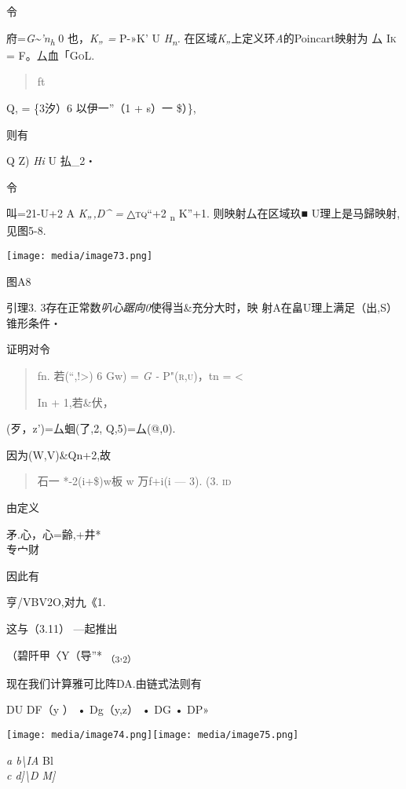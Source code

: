 \documentclass{article}
\begin{document}
令

府=\emph{G\textasciitilde{}'n\textsubscript{h}} 0 也，\emph{K„ =} P-»K'
U \emph{H\textsubscript{n}.}
在区域\emph{K„}上定义环\emph{A}的Poincart映射为 厶 \textsc{Ik} =
F。厶血\textsc{「GoL.}

\begin{quote}
ft
\end{quote}

Q, = \{3汐）6 以伊一''（1 + s）一 \$）\},

则有

Q Z) \emph{Hi} U 払\_2・

令

叫=21-U+2 A \emph{K„,D\^{} =} \textsc{△tq``+2} \textsubscript{n} K''+1.
则映射厶在区域玖■ U理上是马歸映射,见图5-8.

\texttt{[image: media/image73.png]}

图A8

引理3. 3存在正常数\emph{叭心踞向0}使得当\&充分大时，映
射A在畠U理上满足（出,S）锥形条件・

证明对令

\begin{quote}
fn. 若(``,!\textgreater{}) 6 Gw) = \emph{G -} \textsc{P"(r,u)}，tn =
\textless{}

In + 1,若\&伏，
\end{quote}

(歹，z')=厶蛔(了,2, Q,5)=厶(@,0).

因为(W,V)\&Qn+2,故

\begin{quote}
石一 *-2(i+\$)w板 w 万f+i(i --- 3). (3. \textsc{id}
\end{quote}

由定义

矛.心，心=齢,+井*\\
专宀财

因此有

亨/VBV2O,对九《1.

这与（3.11） ---起推出

（碧阡甲〈Y（导''* \textsubscript{（3},\textsubscript{2）}

现在我们计算雅可比阵DA.由链式法则有

DU DF（y ） • Dg（y,z） • DG • DP»

\texttt{[image: media/image74.png]}\texttt{[image: media/image75.png]}

\emph{a b\textbackslash{}IA} Bl\\
\emph{c d{]}\textbackslash{}D M{]}}
\end{document}
